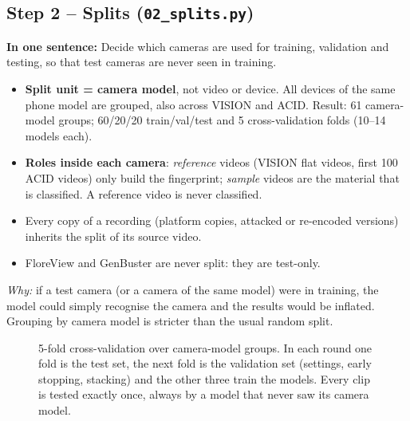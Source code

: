 \documentclass[11pt,a4paper]{article}
\newcommand{\say}[1]{\begin{onesentence}\small\textbf{In one sentence:} #1\end{onesentence}}
\newcommand{\why}[1]{\par\noindent\textit{Why:} #1\par}
\begin{document}
\subsection{Step 2 -- Splits (\texttt{02\_splits.py})}
\say{Decide which cameras are used for training, validation and testing, so that test cameras are never seen in training.}
\begin{itemize}
\item \textbf{Split unit = camera model}, not video or device. All devices of the same phone model are grouped, also across
      VISION and ACID. Result: 61 camera-model groups; 60/20/20 train/val/test and 5 cross-validation folds (10--14 models each).
\item \textbf{Roles inside each camera}: \emph{reference} videos (VISION flat videos, first 100 ACID videos) only build the
      fingerprint; \emph{sample} videos are the material that is classified. A reference video is never classified.
\item Every copy of a recording (platform copies, attacked or re-encoded versions) inherits the split of its source video.
\item FloreView and GenBuster are never split: they are test-only.
\end{itemize}
\why{if a test camera (or a camera of the same model) were in training, the model could simply recognise the camera and the
results would be inflated. Grouping by camera model is stricter than the usual random split.}

\begin{figure}[H]\centering
{}
\caption{5-fold cross-validation over camera-model groups. In each round one fold is the test set, the next fold is the
validation set (settings, early stopping, stacking) and the other three train the models. Every clip is tested exactly once,
always by a model that never saw its camera model.}\label{fig:folds}
\end{figure}
\end{document}
